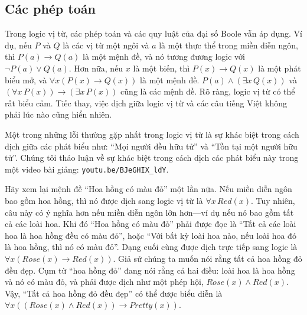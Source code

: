 \subsection{Các phép toán}

Trong logic vị từ, các phép toán và các quy luật của đại số Boole vẫn áp dụng. Ví dụ, nếu $P$ và $Q$ là các vị từ một ngôi và $a$ là một thực thể trong miền diễn ngôn, thì $P(a) \to Q(a)$ là một mệnh đề, và nó tương đương logic với $\neg P(a) \lor Q(a)$. Hơn nữa, nếu $x$ là một biến, thì $P(x) \to Q(x)$ là một phát biểu mở, và $\forall x(P(x) \to Q(x))$ là một mệnh đề. $P(a) \land (\exists x\, Q(x))$ và $(\forall x\, P(x)) \to (\exists x\, P(x))$ cũng là các mệnh đề. Rõ ràng, logic vị từ có thể rất biểu cảm. Tiếc thay, việc dịch giữa logic vị từ và các câu tiếng Việt không phải lúc nào cũng hiển nhiên.

\begin{warningbox}
Một trong những lỗi thường gặp nhất trong logic vị từ là sự khác biệt trong cách dịch giữa các phát biểu như: ``Mọi người đều hữu tử'' và ``Tồn tại một người hữu tử''. Chúng tôi thảo luận về sự khác biệt trong cách dịch các phát biểu này trong một video bài giảng: \texttt{youtu.be/BJeGHIX\_ldY}.
\end{warningbox}

Hãy xem lại mệnh đề ``Hoa hồng có màu đỏ'' một lần nữa. Nếu miền diễn ngôn bao gồm hoa hồng, thì nó được dịch sang logic vị từ là $\forall x\, Red(x)$. Tuy nhiên, câu này có ý nghĩa hơn nếu miền diễn ngôn lớn hơn---ví dụ nếu nó bao gồm tất cả các loài hoa. Khi đó ``Hoa hồng có màu đỏ'' phải được đọc là ``Tất cả các loài hoa là hoa hồng đều có màu đỏ'', hoặc ``Với bất kỳ loài hoa nào, nếu loài hoa đó là hoa hồng, thì nó có màu đỏ''. Dạng cuối cùng được dịch trực tiếp sang logic là $\forall x(Rose(x) \to Red(x))$. Giả sử chúng ta muốn nói rằng tất cả hoa hồng đỏ đều đẹp. Cụm từ ``hoa hồng đỏ'' đang nói rằng cả hai điều: loài hoa là hoa hồng và nó có màu đỏ, và phải được dịch như một phép hội, $Rose(x) \land Red(x)$. Vậy, ``Tất cả hoa hồng đỏ đều đẹp'' có thể được biểu diễn là $\forall x((Rose(x) \land Red(x)) \to Pretty(x))$.

